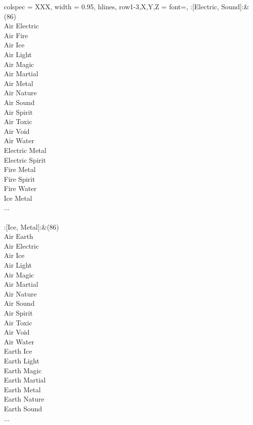 \begin{longtblr}[
	caption = {2v2 Attacking Effective},
	label = {2v2-Attacking-Effective},
]{
	colspec = {XXX}, width = 0.95\linewidth,
	hlines,
	row{1-3,X,Y,Z} = {font=\bfseries},
}
	:[Electric, Sound]:&{(86)\\
	Air Electric \\
	Air Fire \\
	Air Ice \\
	Air Light \\
	Air Magic \\
	Air Martial \\
	Air Metal \\
	Air Nature \\
	Air Sound \\
	Air Spirit \\
	Air Toxic \\
	Air Void \\
	Air Water \\
	Electric Metal \\
	Electric Spirit \\
	Fire Metal \\
	Fire Spirit \\
	Fire Water \\
	Ice Metal \\
	...\\
	}\\

	:[Ice, Metal]:&{(86)\\
	Air Earth \\
	Air Electric \\
	Air Ice \\
	Air Light \\
	Air Magic \\
	Air Martial \\
	Air Nature \\
	Air Sound \\
	Air Spirit \\
	Air Toxic \\
	Air Void \\
	Air Water \\
	Earth Ice \\
	Earth Light \\
	Earth Magic \\
	Earth Martial \\
	Earth Metal \\
	Earth Nature \\
	Earth Sound \\
	...\\
	}\\


\end{longtblr}
